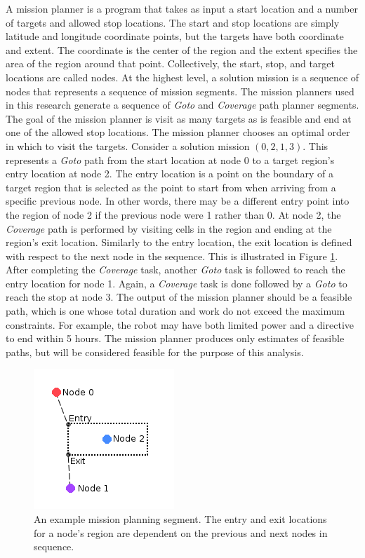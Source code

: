 \documentclass{tamuccthesis}
\begin{document}
A mission planner is a program that takes as input a start location and a number of targets and allowed stop locations. The start and stop locations are simply latitude and longitude coordinate points, but the targets have both coordinate and extent. The coordinate is the center of the region and the extent specifies the area of the region around that point. Collectively, the start, stop, and target locations are called nodes. At the highest level, a solution mission is a sequence of nodes that represents a sequence of mission segments. The mission planners used in this research generate a sequence of \textit{Goto} and \textit{Coverage} path planner segments. The goal of the mission planner is visit as many targets as is feasible and end at one of the allowed stop locations.  The mission planner chooses an optimal order in which to visit the targets. Consider a solution mission $( 0, 2, 1, 3 )$. This represents a \textit{Goto} path from the start location at node 0 to a target region's entry location at node 2. The entry location is a point on the boundary of a target region that is selected as the point to start from when arriving from a specific previous node. In other words, there may be a different entry point into the region of node 2 if the previous node were 1 rather than 0. At node 2, the \textit{Coverage} path is performed by visiting cells in the region and ending at the region's exit location. Similarly to the entry location, the exit location is defined with respect to the next node in the sequence. This is illustrated in Figure \ref{segment_example}. After completing the \textit{Coverage} task, another \textit{Goto} task is followed to reach the entry location for node 1. Again, a \textit{Coverage} task is done followed by a \textit{Goto} to reach the stop at node 3. The output of the mission planner should be a feasible path, which is one whose total duration and work do not exceed the maximum constraints. For example, the robot may have both limited power and a directive to end within 5 hours. The mission planner produces only estimates of feasible paths, but will be considered feasible for the purpose of this analysis. 

\begin{figure}[h]
\includegraphics[]{segment_example.png}
\caption[Entry and exit points of coverage region.]{An example mission planning segment. The entry and exit locations for a node's region are dependent on the previous and next nodes in sequence.}
\label{segment_example}
\end{figure}
\end{document}
